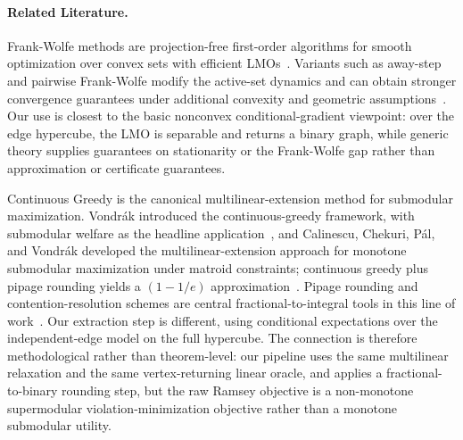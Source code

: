 \documentclass{article}
\begin{document}
\paragraph{Related Literature.}
Frank-Wolfe methods are projection-free first-order algorithms for smooth optimization over convex sets with efficient LMOs~\cite{frank1956algorithm,jaggi2013revisiting,braun2022conditional}. Variants such as away-step and pairwise Frank-Wolfe modify the active-set dynamics and can obtain stronger convergence guarantees under additional convexity and geometric assumptions~\cite{lacostejulien2015global}. Our use is closest to the basic nonconvex conditional-gradient viewpoint: over the edge hypercube, the LMO is separable and returns a binary graph, while generic theory supplies guarantees on stationarity or the Frank-Wolfe gap rather than approximation or certificate guarantees.

Continuous Greedy is the canonical multilinear-extension method for submodular maximization. Vondr{\'a}k introduced the continuous-greedy framework, with submodular welfare as the headline application~\cite{vondrak2008optimal}, and Calinescu, Chekuri, P{\'a}l, and Vondr{\'a}k developed the multilinear-extension approach for monotone submodular maximization under matroid constraints; continuous greedy plus pipage rounding yields a $(1-1/e)$ approximation~\cite{calinescu2011maximizing}. Pipage rounding and contention-resolution schemes are central fractional-to-integral tools in this line of work~\cite{ageev2004pipage,chekuri2011contention}. Our extraction step is different, using conditional expectations over the independent-edge model on the full hypercube. The connection is therefore methodological rather than theorem-level: our pipeline uses the same multilinear relaxation and the same vertex-returning linear oracle, and applies a fractional-to-binary rounding step, but the raw Ramsey objective is a non-monotone supermodular violation-minimization objective rather than a monotone submodular utility.
\end{document}
